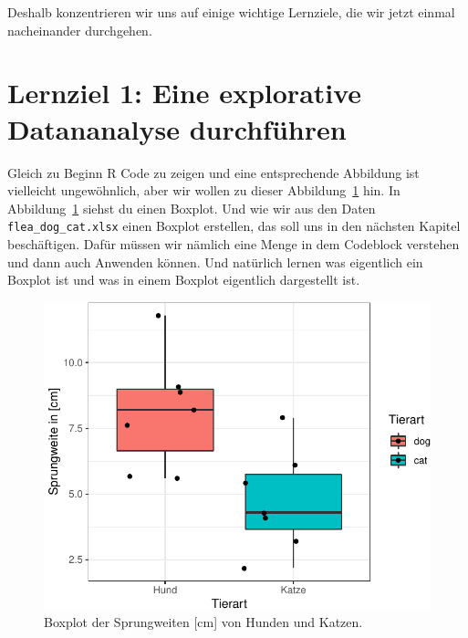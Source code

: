 \documentclass[
  letterpaper,
]{scrbook}
\begin{document}
Deshalb konzentrieren wir uns auf einige wichtige Lernziele, die wir
jetzt einmal nacheinander durchgehen.

\hypertarget{lernziel-1-eine-explorative-datananalyse-durchfuxfchren}{%
\section{Lernziel 1: Eine explorative Datananalyse
durchführen}\label{lernziel-1-eine-explorative-datananalyse-durchfuxfchren}}

Gleich zu Beginn R Code zu zeigen und eine entsprechende Abbildung ist
vielleicht ungewöhnlich, aber wir wollen zu dieser
Abbildung~\ref{fig-boxplot-preface} hin. In
Abbildung~\ref{fig-boxplot-preface} siehst du einen Boxplot. Und wie wir
aus den Daten \texttt{flea\_dog\_cat.xlsx} einen Boxplot erstellen, das
soll uns in den nächsten Kapitel beschäftigen. Dafür müssen wir nämlich
eine Menge in dem Codeblock verstehen und dann auch Anwenden können. Und
natürlich lernen was eigentlich ein Boxplot ist und was in einem Boxplot
eigentlich dargestellt ist.

\begin{figure}

{\centering \includegraphics{./preface_files/figure-pdf/fig-boxplot-preface-1.pdf}

}

\caption{\label{fig-boxplot-preface}Boxplot der Sprungweiten {[}cm{]}
von Hunden und Katzen.}

\end{figure}
\end{document}
